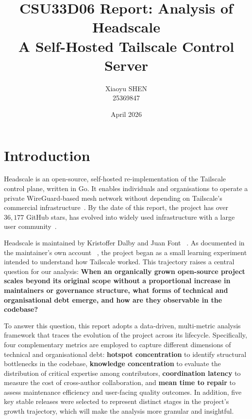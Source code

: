 \documentclass[11pt, a4paper]{article}
\title{\textbf{CSU33D06 Report: Analysis of Headscale}\\
       \large A Self-Hosted Tailscale Control Server}
\author{Xiaoyu SHEN \\ 25369847}
\date{April 2026}
\begin{document}
\maketitle

\section{Introduction}

Headscale is an open-source, self-hosted re-implementation of the Tailscale control plane, written in Go. It enables individuals and organisations to operate a private WireGuard-based mesh network without depending on Tailscale's commercial infrastructure~\cite{headscale_website_about_faq}. By the date of this report, the project has over $36,177$ GitHub stars, has evolved into widely used infrastructure with a large user community~\cite{headscale_github}.

Headscale is maintained by Kristoffer Dalby and Juan Font ~\cite{headscale_website_welcome}. As documented in the maintainer's own account ~\cite{headscale_FOSDEM2026_speech}, the project began as a small learning experiment intended to understand how Tailscale worked. This trajectory raises a central question for our analysis: \textbf{When an organically grown open-source project scales beyond its original scope without a proportional increase in maintainers or governance structure, what forms of technical and organisational debt emerge, and how are they observable in the codebase?}

To answer this question, this report adopts a data-driven, multi-metric analysis framework that traces the evolution of the project across its lifecycle. Specifically, four complementary metrics are employed to capture different dimensions of technical and organisational debt: \textbf{hotspot concentration} to identify structural bottlenecks in the codebase, \textbf{knowledge concentration} to evaluate the distribution of critical expertise among contributors, \textbf{coordination latency} to measure the cost of cross-author collaboration, and \textbf{mean time to repair} to assess maintenance efficiency and user-facing quality outcomes. In addition, five key stable releases were selected to represent distinct stages in the project's growth trajectory, which will make the analysis more granular and insightful.

\end{document}

